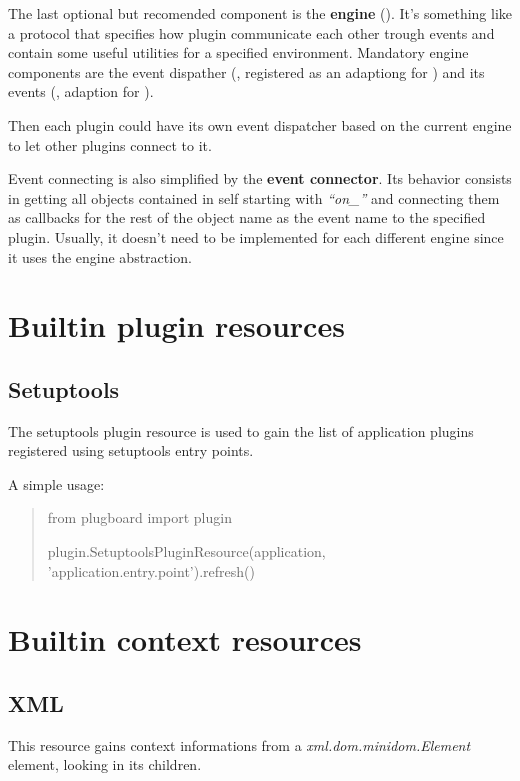 \documentclass[12pt,a4paper]{report}
\begin{document}
The last optional but recomended component is the \textbf{engine}
(). It's something like a protocol that specifies
how plugin communicate each other trough events and contain some useful
utilities for a specified environment. Mandatory engine components
are the event dispather (, registered as
an adaptiong for ) and its events (,
adaption for ).

Then each plugin could have its own event dispatcher based on the
current engine to let other plugins connect to it.

Event connecting is also simplified by the \textbf{event connector}.
Its behavior consists in getting all objects contained in self starting
with \emph{{}``on\_''} and connecting them as callbacks for the
rest of the object name as the event name to the specified plugin.
Usually, it doesn't need to be implemented for each different engine
since it uses the engine abstraction.


\chapter{Builtin plugin resources}


\section{Setuptools}

The setuptools plugin resource is used to gain the list of application
plugins registered using setuptools entry points.

A simple usage:


\begin{quote}
from plugboard import plugin

plugin.SetuptoolsPluginResource(application, 'application.entry.point').refresh()
\end{quote}

\chapter{Builtin context resources}


\section{XML}

This resource gains context informations from a \emph{xml.dom.minidom.Element}
element, looking in its children.
\end{document}

